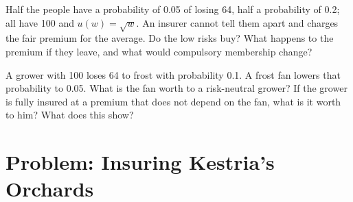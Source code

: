 \begin{exercise}[$\star\star\star$]\label{exo:g12:risk-and-insurance:14}
Half the people have a probability of 0.05 of losing 64, half a probability of 0.2; all have  100 and $u(w) = \sqrt{w}$. An insurer cannot tell them apart and
charges the fair premium for the average. Do the low risks buy? What happens to the premium if they leave, and what would compulsory membership change?
\end{exercise}

\begin{exercise}[$\star\star\star$]\label{exo:g12:risk-and-insurance:15}
A grower with  100 loses 64 to frost with probability 0.1. A frost fan lowers that probability to 0.05. What is the fan worth to a risk-neutral grower? If the grower is
fully insured at a premium that does not depend on the fan, what is it worth to him? What does this show?
\end{exercise}

\section{Problem: Insuring Kestria's Orchards}

